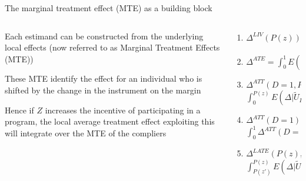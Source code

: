 \documentclass[notes,11pt, aspectratio=169]{beamer}
\newenvironment{wideitemize}{\itemize\addtolength{\itemsep}{10pt}}{\enditemize}
\begin{document}
\begin{frame}{The marginal treatment effect (MTE) as a building block}
  \begin{columns}[T] %
    \begin{column}{0.5\textwidth}
      \begin{wideitemize}
      \item Each estimand can be constructed from the underlying local
        effects (now referred to as Marginal Treatment Effects (MTE))
      \item These MTE identify the effect for an individual who is
        shifted by the change in the instrument on the margin
      \item Hence if $Z$ increases the incentive of participating in a
        program, the local average treatment effect exploiting this
        will integrate over the MTE of the compliers
      \end{wideitemize}
\end{column}
\begin{column}{0.5\textwidth}
  \begin{enumerate}
        \item $\Delta^{LIV}(P(z)) = E(\Delta | \widetilde{U}_{D} = P(z))$
        \item $\Delta^{ATE} = \int_{0}^{1}E(\Delta | \widetilde{U}_{D} = u) du$
        \item $\Delta^{ATT}(D = 1, P(z)) =$\\
          $\int_{0}^{P(z)}E(\Delta | \widetilde{U}_{D} = u) du \big/ P(z)$
        \item $\Delta^{ATT}(D = 1) =$\\
          $\int_{0}^{1}\Delta^{ATT}(D = 1, P(z)) dF_{P(Z)|D=1}$
        \item $\Delta^{LATE}(P(z), P(z')) =$\\
          $\int_{P(z')}^{P(z)}E(\Delta | \widetilde{U}_{D} = u) du \big/ (P(z) - P(z'))$
        \end{enumerate}
\end{column}
\end{columns}
\end{frame}
\end{document}
